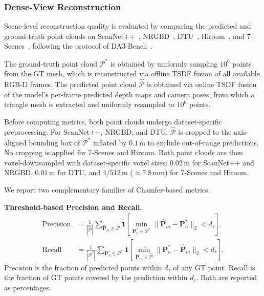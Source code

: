 \documentclass{llmxive}
\begin{document}
\subsubsection{Dense-View Reconstruction}
\label{appendix:metrics:recon}

Scene-level reconstruction quality is evaluated by comparing the predicted and ground-truth point clouds on ScanNet++~\citep{yeshwanth2023scannet++}, NRGBD~\citep{azinovic2022Neuralrgbd}, DTU~\citep{jensen2014dtu}, Hiroom~\citep{lin2025depth}, and 7-Scenes~\citep{shotton20137scenes}, following the protocol of DA3-Bench~\citep{lin2025depth}.

The ground-truth point cloud $\mathcal{P}^{*}$ is obtained by uniformly sampling 
$10^{6}$ points from the GT mesh, which is reconstructed via offline TSDF fusion 
of all available RGB-D frames.
%
The predicted point cloud $\hat{\mathcal{P}}$ is obtained via online TSDF fusion of the model's per-frame predicted depth maps and camera poses, from which a triangle mesh is extracted and uniformly resampled to $10^{6}$ points.

Before computing metrics, both point clouds undergo dataset-specific preprocessing.
%
For ScanNet++, NRGBD, and DTU, $\hat{\mathcal{P}}$ is cropped to the axis-aligned bounding box of $\mathcal{P}^{*}$ inflated by $0.1$\,m to exclude out-of-range predictions. 
%
No cropping is applied for 7-Scenes and Hiroom.
%
Both point clouds are then voxel-downsampled with dataset-specific voxel sizes: $0.02$\,m for ScanNet++ and NRGBD, $0.01$\,m for DTU, and $4/512$\,m (${\approx}7.8$\,mm) for 7-Scenes and Hiroom.

We report two complementary families of Chamfer-based metrics.

\noindent\textbf{Threshold-based Precision and Recall.}
\begin{align}
  \mathrm{Precision}
  &= \frac{1}{|\hat{\mathcal{P}}|}\sum_{\hat{\mathbf{P}}_m\in\hat{\mathcal{P}}}
    \mathbf{1}\!\left[\min_{\mathbf{P}_n^{*}\in\mathcal{P}^{*}}
    \bigl\|\hat{\mathbf{P}}_m - \mathbf{P}_n^{*}\bigr\|_2 < d_{\tau}\right], \\
  \mathrm{Recall}
  &= \frac{1}{|\mathcal{P}^{*}|}\sum_{\mathbf{P}_n^{*}\in\mathcal{P}^{*}}
    \mathbf{1}\!\left[\min_{\hat{\mathbf{P}}_m\in\hat{\mathcal{P}}}
    \bigl\|\mathbf{P}_n^{*} - \hat{\mathbf{P}}_m\bigr\|_2 < d_{\tau}\right].
\end{align}
Precision is the fraction of predicted points within $d_{\tau}$ of any GT point. 
Recall is the fraction of GT points covered by the prediction within $d_{\tau}$. 
Both are reported as percentages.
\end{document}
